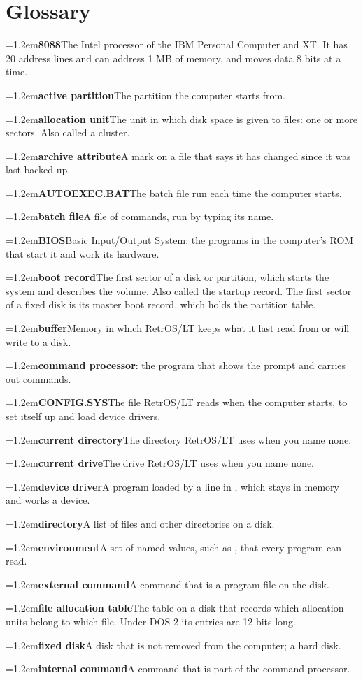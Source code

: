 \mwnewpart
\renewcommand\runningtitle{Glossary}
\chapter*{Glossary}
\setcounter{page}{1}

\newcommand\gl[2]{\par\noindent\hangindent=1.2em\textbf{#1}\quad #2\par}

\gl{8088}{The Intel processor of the IBM Personal Computer and XT. It has
20 address lines and can address 1 MB of memory, and moves data 8 bits at
a time.}
\gl{active partition}{The partition the computer starts from.}
\gl{allocation unit}{The unit in which disk space is given to files: one or
more sectors. Also called a cluster.}
\gl{archive attribute}{A mark on a file that says it has changed since it
was last backed up.}
\gl{AUTOEXEC.BAT}{The batch file run each time the computer starts.}
\gl{batch file}{A file of commands, run by typing its name.}
\gl{BIOS}{Basic Input/Output System: the programs in the computer's ROM that
start it and work its hardware.}
\gl{boot record}{The first sector of a disk or partition, which starts the
system and describes the volume. Also called the startup record. The
first sector of a fixed disk is its master boot record, which holds the
partition table.}
\gl{buffer}{Memory in which RetrOS/LT keeps what it last read from or will
write to a disk.}
\gl{command processor}{: the program that shows the
prompt and carries out commands.}
\gl{CONFIG.SYS}{The file RetrOS/LT reads when the computer starts, to set
itself up and load device drivers.}
\gl{current directory}{The directory RetrOS/LT uses when you name none.}
\gl{current drive}{The drive RetrOS/LT uses when you name none.}
\gl{device driver}{A program loaded by a  line in
\file{CONFIG.SYS}, which stays in memory and works a device.}
\gl{directory}{A list of files and other directories on a disk.}
\gl{environment}{A set of named values, such as , that every
program can read.}
\gl{external command}{A command that is a program file on the disk.}
\gl{file allocation table}{The table on a disk that records which
allocation units belong to which file. Under DOS 2 its entries are 12
bits long.}
\gl{fixed disk}{A disk that is not removed from the computer; a hard
disk.}
\gl{internal command}{A command that is part of the command processor.}
